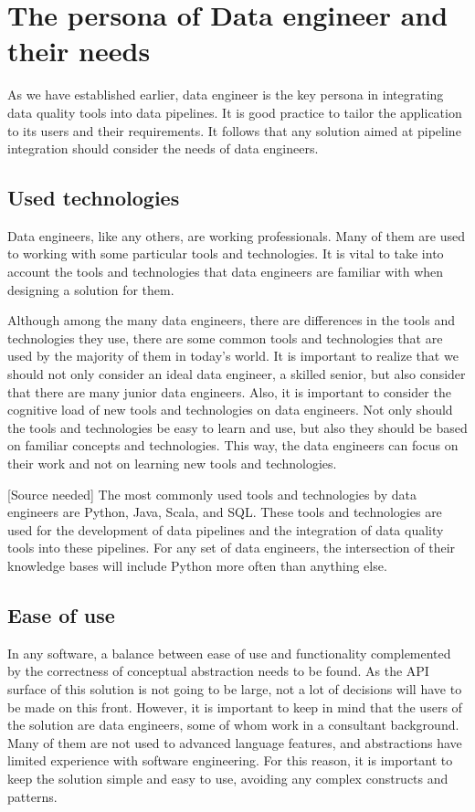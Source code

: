 \section{The persona of Data engineer and their needs}

As we have established earlier, data engineer is the key persona in integrating data quality tools into data pipelines. It is good practice to tailor the application to its users and their requirements. It follows that any solution aimed at pipeline integration should consider the needs of data engineers.

\subsection{Used technologies}

Data engineers, like any others, are working professionals. Many of them are used to working with some particular tools and technologies. It is vital to take into account the tools and technologies that data engineers are familiar with when designing a solution for them.

Although among the many data engineers, there are differences in the tools and technologies they use, there are some common tools and technologies that are used by the majority of them in today's world. It is important to realize that we should not only consider an ideal data engineer, a skilled senior, but also consider that there are many junior data engineers. Also, it is important to consider the cognitive load of new tools and technologies on data engineers. Not only should the tools and technologies be easy to learn and use, but also they should be based on familiar concepts and technologies. This way, the data engineers can focus on their work and not on learning new tools and technologies. 

[Source needed] The most commonly used tools and technologies by data engineers are Python, Java, Scala, and SQL. These tools and technologies are used for the development of data pipelines and the integration of data quality tools into these pipelines. For any set of data engineers, the intersection of their knowledge bases will include Python more often than anything else.

\subsection{Ease of use}

In any software, a balance between ease of use and functionality complemented by the correctness of conceptual abstraction needs to be found. As the API surface of this solution is not going to be large, not a lot of decisions will have to be made on this front. However, it is important to keep in mind that the users of the solution are data engineers, some of whom work in a consultant background. Many of them are not used to advanced language features, and abstractions have limited experience with software engineering. For this reason, it is important to keep the solution simple and easy to use, avoiding any complex constructs and patterns.

